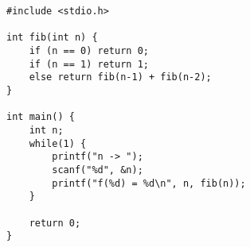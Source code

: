 \begin{lstlisting}[caption=fib.c]
#include <stdio.h>

int fib(int n) {
	if (n == 0) return 0;
	if (n == 1) return 1;
	else return fib(n-1) + fib(n-2);
}

int main() {
	int n;
	while(1) {
		printf("n -> ");
		scanf("%d", &n);
		printf("f(%d) = %d\n", n, fib(n));
	}

	return 0;
}
\end{lstlisting}